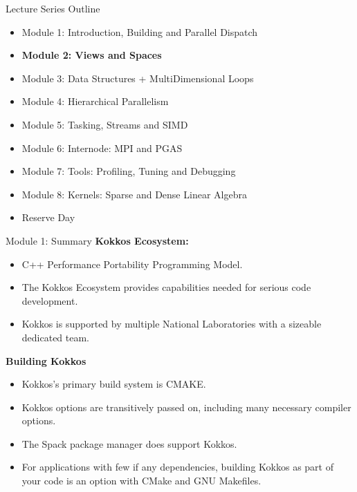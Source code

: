 \begin{frame}{Lecture Series Outline}

\begin{itemize}
        \item Module 1: Introduction, Building and Parallel Dispatch
        \item \textbf{Module 2: Views and Spaces}
        \item Module 3: Data Structures + MultiDimensional Loops
        \item Module 4: Hierarchical Parallelism
        \item Module 5: Tasking, Streams and SIMD
        \item Module 6: Internode: MPI and PGAS
        \item Module 7: Tools: Profiling, Tuning and Debugging
        \item Module 8: Kernels: Sparse and Dense Linear Algebra
        \item Reserve Day
\end{itemize}
\end{frame}

\begin{frame}{Module 1: Summary}
	\textbf{Kokkos Ecosystem:}
	\begin{itemize}
		\item C++ Performance Portability Programming Model.
		\item The Kokkos Ecosystem provides capabilities needed for serious code development.
		\item Kokkos is supported by multiple National Laboratories with a sizeable dedicated team.
	\end{itemize}

	\textbf{Building Kokkos}
	\begin{itemize}
    \item{Kokkos's primary build system is CMAKE.}
    \item{Kokkos options are transitively passed on, including many necessary compiler options.}
    \item{The Spack package manager does support Kokkos.}
    \item{For applications with few if any dependencies, building Kokkos as part of your code is an option with CMake and GNU Makefiles.}
	\end{itemize}
\end{frame}

